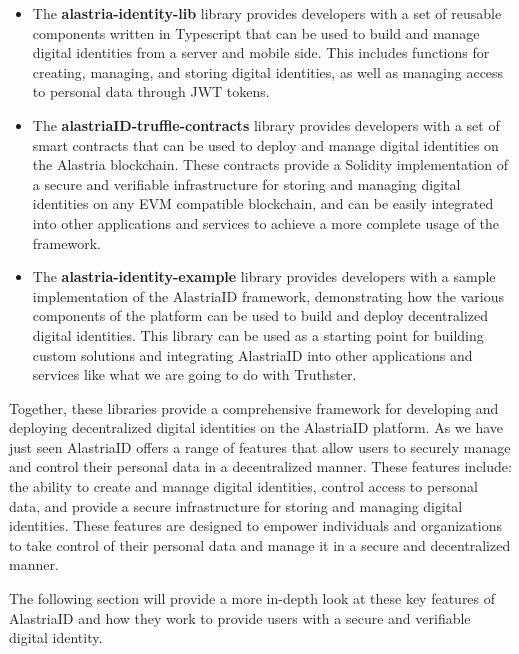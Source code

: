 \documentclass[target=mst,aauheader=]{thud}
\begin{document}
\begin{itemize}

    \item The \textbf{alastria-identity-lib\cite{alastriaIdentityLib}} library provides developers with a set of reusable components written in Typescript that can be used to build and manage digital identities from a server and mobile side. This includes functions for creating, managing, and storing digital identities, as well as managing access to personal data through JWT tokens.
    \item The \textbf{alastriaID-truffle-contracts\cite{alastriaSmartContracts}} library provides developers with a set of smart contracts that can be used to deploy and manage digital identities on the Alastria blockchain. These contracts provide a Solidity implementation of a secure and verifiable infrastructure for storing and managing digital identities on any EVM compatible blockchain, and can be easily integrated into other applications and services to achieve a more complete usage of the framework.
    \item The \textbf{alastria-identity-example\cite{alastriaIdentityExample}} library provides developers with a sample implementation of the AlastriaID framework, demonstrating how the various components of the platform can be used to build and deploy decentralized digital identities. This library can be used as a starting point for building custom solutions and integrating AlastriaID into other applications and services like what we are going to do with Truthster.

\end{itemize}

Together, these libraries provide a comprehensive framework for developing and deploying decentralized digital identities on the AlastriaID platform. 
As we have just seen AlastriaID offers a range of features that allow users to securely manage and control their personal data in a decentralized manner. These features include: the ability to create and manage digital identities, control access to personal data, and provide a secure infrastructure for storing and managing digital identities. These features are designed to empower individuals and organizations to take control of their personal data and manage it in a secure and decentralized manner.\par
The following section will provide a more in-depth look at these key features of AlastriaID and how they work to provide users with a secure and verifiable digital identity.
\end{document}

